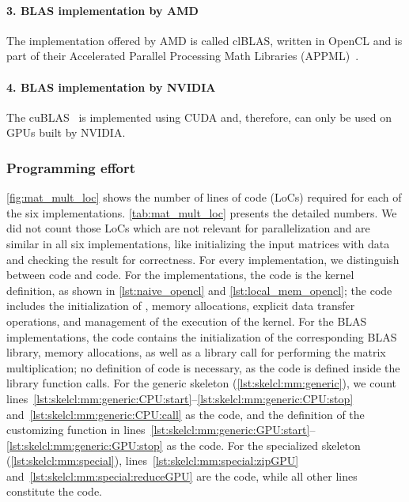 \paragraph{3. BLAS implementation by AMD}
The implementation offered by AMD is called clBLAS, written in OpenCL and is part of their Accelerated Parallel Processing Math Libraries (APPML)~\cite{APPML}.

\vspace{-.5em}
\paragraph{4. BLAS implementation by NVIDIA}
The cuBLAS~\cite{cuBLAS} is implemented using CUDA and, therefore, can only be used on GPUs built by NVIDIA.

\subsubsection*{Programming effort}
\autoref{fig:mat_mult_loc} shows the number of lines of code (LoCs) required for each of the six implementations.
\autoref{tab:mat_mult_loc} presents the detailed numbers.
We did not count those LoCs which are not relevant for parallelization and are similar in all six implementations, like initializing the input matrices with data and checking the result for correctness.
For every implementation, we distinguish between \CPU code and \GPU code.
For the \OpenCL implementations, the \GPU code is the kernel definition, as shown in \autoref{lst:naive_opencl} and \autoref{lst:local_mem_opencl};
the \CPU code includes the initialization of \OpenCL, memory allocations, explicit data transfer operations, and management of the execution of the kernel.
For the BLAS implementations, the \CPU code contains the initialization of the corresponding BLAS library, memory allocations, as well as a library call for performing the matrix multiplication;
no definition of \GPU code is necessary, as the \GPU code is defined inside the library function calls.
For the generic \allpairs skeleton (\autoref{lst:skelcl:mm:generic}), we count lines~\ref{lst:skelcl:mm:generic:CPU:start}--\ref{lst:skelcl:mm:generic:CPU:stop} and~\ref{lst:skelcl:mm:generic:CPU:call} as the \CPU code, and the definition of the customizing function in lines~\ref{lst:skelcl:mm:generic:GPU:start}--\ref{lst:skelcl:mm:generic:GPU:stop} as the \GPU code.
For the specialized \allpairs skeleton (\autoref{lst:skelcl:mm:special}), lines~\ref{lst:skelcl:mm:special:zipGPU} and~\ref{lst:skelcl:mm:special:reduceGPU} are the \GPU code, while all other lines constitute the \CPU code.

